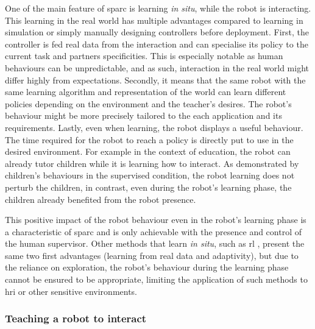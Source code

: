 One of the main feature of \gls{sparc} is learning \emph{in situ}, while the robot is interacting. This learning in the real world has multiple advantages compared to learning in simulation or simply manually designing controllers before deployment. First, the controller is fed real data from the interaction and can specialise its policy to the current task and partners specificities. This is especially notable as human behaviours can be unpredictable, and as such, interaction in the real world might differ highly from expectations. Secondly, it means that the same robot with the same learning algorithm and representation of the world can learn different policies depending on the environment and the teacher's desires. The robot's behaviour might be more precisely tailored to the each application and its requirements. Lastly, even when learning, the robot displays a useful behaviour. The time required for the robot to reach a policy is directly put to use in the desired environment. For example in the context of education, the robot can already tutor children while it is learning how to interact. As demonstrated by children's behaviours in the supervised condition, the robot learning does not perturb the children, in contrast, even during the robot's learning phase, the children already benefited from the robot presence. 

This positive impact of the robot behaviour even in the robot's learning phase is a characteristic of \gls{sparc} and is only achievable with the presence and control of the human supervisor. Other methods that learn \emph{in situ}, such as \gls{rl} \citep{sutton1998reinforcement}, present the same two first advantages (learning from real data and adaptivity), but due to the reliance on exploration, the robot's behaviour during the learning phase cannot be ensured to be appropriate, limiting the application of such methods to \gls{hri} or other sensitive environments.

\subsubsection{Teaching a robot to interact}

